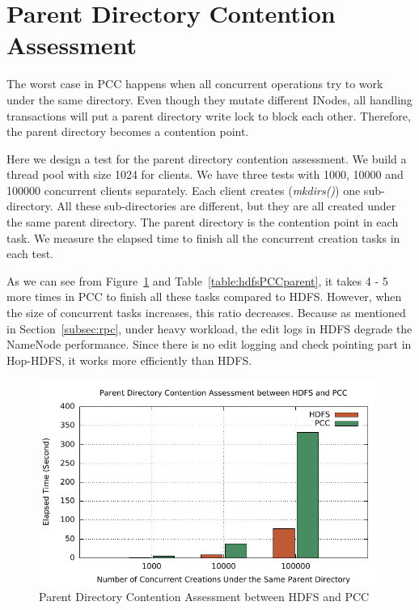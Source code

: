 \section{Parent Directory Contention Assessment}
\label{sec:pdcassement}
The worst case in PCC happens when all concurrent operations try to work under the same directory. Even though they mutate different INodes, all handling transactions will put a parent directory write lock to block each other. Therefore, the parent directory becomes a contention point.

\noindent Here we design a test for the parent directory contention assessment. We build a thread pool with size 1024 for clients. We have three tests with 1000, 10000 and 100000 concurrent clients separately. Each client creates (\textit{mkdirs()}) one sub-directory. All these sub-directories are different, but they are all created under the same parent directory. The parent directory is the contention point in each task. We measure the elapsed time to finish all the concurrent creation tasks in each test.

\noindent As we can see from Figure~\ref{fig:hdfsPCCparent} and Table~\ref{table:hdfsPCCparent}, it takes 4 - 5 more times in PCC to finish all these tasks compared to HDFS. However, when the size of concurrent tasks increases, this ratio decreases. Because as mentioned in Section~\ref{subsec:rpc}, under heavy workload, the edit logs in HDFS degrade the NameNode performance. Since there is no edit logging and check pointing part in Hop-HDFS, it works more efficiently than HDFS.

\begin{figure}[h]
	\centering
	\includegraphics[width=\linewidth]{figs/hdfs_pcc_parentlock.pdf}
	\caption{Parent Directory Contention Assessment between HDFS and PCC}
	\label{fig:hdfsPCCparent}
\end{figure}

